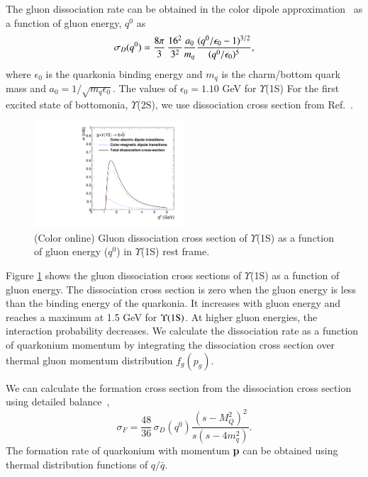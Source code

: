 {  The gluon dissociation rate can be obtained in the color dipole
approximation~\cite{Bhanot:1979vb} as a function of gluon energy, $q^0$ as
 \begin{equation}
    \sigma_{D}(q^{0}) = {8\pi \over 3} \, {16^2 \over 3^2} {a_0 \over m_q}  \frac{(q^0/\epsilon_0 - 1)^{3/2}} {(q^0/\epsilon_0)^5},
 \end{equation}
  where $\epsilon_0$ is the quarkonia binding energy and $m_q$ is the charm/bottom quark mass 
  and $a_0=1/\sqrt{m_q\epsilon_0}$.
  The values of $\epsilon_0=1.10$ GeV for $\Upsilon$(1S) \cite{Karsch:1987pv}
For the first excited state of bottomonia, $\Upsilon$(2S), we use dissociation
 cross section from Ref.~\cite{Arleo:2001mp}.

  \begin{figure}
    \begin{center}
    \includegraphics[width=0.50\textwidth]{Figures/Quarkonia_502TeV/Fig1b_Y1S_SigmaDq0.pdf}
    \caption{(Color online) Gluon dissociation cross section of $\Upsilon$(1S) as a
      function of gluon energy ($q^{0}$) in $\Upsilon$(1S) rest frame.}
    \label{fig:SigmaDQ0}
    \end{center}
  \end{figure}

  
  Figure \ref{fig:SigmaDQ0} shows the gluon dissociation cross sections of
$\Upsilon$(1S) as a function of gluon energy. The dissociation cross section
is zero when the gluon energy is less than the binding energy of the quarkonia.
It increases with gluon energy and reaches a maximum at 1.5 GeV for 
$\Upsilon(1{\rm S})$. At higher gluon energies, the interaction
probability decreases. We calculate the dissociation rate as a function of quarkonium
momentum by integrating the dissociation cross section over thermal gluon momentum 
distribution $f_{g}(p_g)$.


 We can calculate the formation cross section from the dissociation cross section using
detailed balance~\cite{Thews:2000rj,Thews:2005vj},
  \begin{equation}
    \sigma_{F} = \frac{48}{36}\,\sigma_{D}(q^0)\frac{(s-M_{Q}^2)^{2}}{s(s-4m_q^{2})}.
  \end{equation}
  The formation rate of quarkonium with momentum {\bf p} can be obtained using
  thermal distribution functions of  $q/\bar{q}$.
  
}
